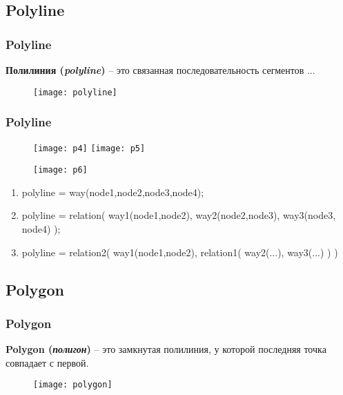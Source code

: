 \subsection{Polyline}
\begin{frame}
    \frametitle{Polyline}
    \textbf{Полилиния (\emph{polyline})} -- это связанная последовательность 
    сегментов ...
    \begin{figure}[ht!]
        \center
        \texttt{[image: polyline]}
    \end{figure}
\end{frame}

\begin{frame}
    \frametitle{Polyline}
    \begin{figure}[ht!]
        \texttt{[image: p4]}
        \texttt{[image: p5]}
    \end{figure}
    \begin{minipage}[h]{0.49\textwidth}
        \begin{figure}[ht!]
            \texttt{[image: p6]}
        \end{figure}
    \end{minipage}
    \scriptsize
    \begin{minipage}[h]{0.49\textwidth}
        \begin{enumerate}
            \item polyline = way(node1,node2,node3,node4);
            \item polyline = relation( way1(node1,node2),
                way2(node2,node3), way3(node3, node4) );
            \item polyline = relation2( way1(node1,node2), 
                relation1( way2(...), way3(...) ) )
        \end{enumerate}
    \end{minipage}
\end{frame}

\subsection{Polygon}
\begin{frame}
    \frametitle{Polygon}
    \textbf{Polygon (\emph{полигон})} -- это замкнутая полилиния, у которой 
    последняя точка совпадает с первой.
    \begin{figure}[ht!]
        \center
        \texttt{[image: polygon]}
    \end{figure}
\end{frame}

